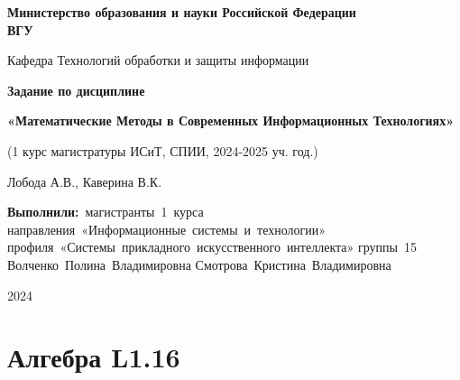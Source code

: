 \documentclass[12pt]{article}
\begin{document}
\linespread{1,5}
\thispagestyle{empty} %
\begin{titlepage}
    \newpage
    \begin{center}
    {\bfseries Министерство образования и науки Российской Федерации \\
    ВГУ}
    \vspace{1cm}

     Кафедра Технологий обработки и защиты информации
     \vspace{2em}

     \end{center}

    \vspace{5em}

    \begin{center}
    \Large
\textbf{Задание по дисциплине}

\normalsize
\textbf{«Математические Методы в Современных Информационных Технологиях»}

(1 курс магистратуры ИСиТ, СПИИ, 2024-2025 уч. год.)

Лобода А.В., Каверина В.К.
     \end{center}
    \vspace{5em}


   \vbox{%
\hfill%
\vbox{%
\hbox{\textbf{Выполнили:} магистранты 1 курса}%
\hbox{направления «Информационные системы и технологии»}%
\hbox{профиля «Системы прикладного искусственного интеллекта»}%
\hbox{группы 15}%
\hbox{Волченко Полина Владимировна}%
\hbox{Смотрова Кристина Владимировна}%
\hbox{}%
}%
} 

    \begin{center}
    \vspace{5em}
    2024
    \end{center}

    \end{titlepage}
\newpage

\section{Алгебра L1.16}
\end{document}
